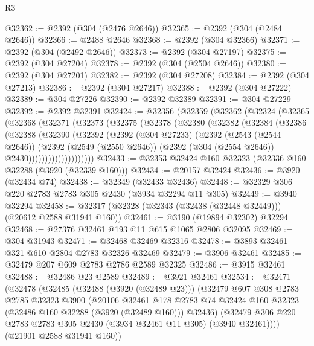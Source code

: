 \begin{lexlean}{R3}
\begin{coremodule}
@32362 := @2392 (@304 (@2476 @2646))
@32365 := @2392 (@304 (@2484 @2646))
@32366 := @2488 @2646
@32368 := @2392 (@304 @32366)
@32371 := @2392 (@304 (@2492 @2646))
@32373 := @2392 (@304 @27197)
@32375 := @2392 (@304 @27204)
@32378 := @2392 (@304 (@2504 @2646))
@32380 := @2392 (@304 @27201)
@32382 := @2392 (@304 @27208)
@32384 := @2392 (@304 @27213)
@32386 := @2392 (@304 @27217)
@32388 := @2392 (@304 @27222)
@32389 := @304 @27226
@32390 := @2392 @32389
@32391 := @304 @27229
@32392 := @2392 @32391
@32424 := @32356
    (@32359
      (@32362
        (@32324
          (@32365
            (@32368
              (@32371
                (@32373
                  (@32375
                    (@32378
                      (@32380
                        (@32382
                          (@32384
                            (@32386
                              (@32388
                                (@32390
                                  (@32392
                                    (@2392
                                      (@304 @27233)
                                      (@2392
                                        (@2543 (@2544 @2646))
                                        (@2392
                                          (@2549 (@2550 @2646))
                                          (@2392 (@304 (@2554 @2646)) @2430))))))))))))))))))))
@32433 := @32353 @32424 @160 @32323 (@32336 @160 @32288 (@3920 (@32339 @160)))
@32434 := @20157 @32424
@32436 := @3920 (@32434 @74)
@32438 := @32349 (@32433 @32436)
@32448 := @32329 @306 @220 @2783 @2783 @305 @2430 (@3934 @32294 @11 @305)
@32449 := @3940 @32294
@32458 := @32317 (@32328 (@32343 (@32438 (@32448 @32449))) (@20612 @2588 @31941 @160))
@32461 := @3190 (@19894 @32302) @32294
@32468 := @27376 @32461 @193 @11 @615 @1065 @2806 @32095
@32469 := @304 @31943
@32471 := @32468 @32469 @32316
@32478 := @3893 @32461 @321 @610 @2804 @2783 @32326 @32469
@32479 := @3906 @32461
@32485 := @32479 @207 @609 @2783 @2786 @2589 @32325
@32486 := @3915 @32461
@32488 := @32486 @23 @2589
@32489 := @3921 @32461
@32534 := @32471
    (@32478
      (@32485
        (@32488 (@3920 (@32489 @23)))
        (@32479
          @607
          @308
          @2783
          @2785
          @32323
          @3900
          (@20106
            @32461
            @178
            @2783
            @74
            @32424
            @160
            @32323
            (@32486 @160 @32288 (@3920 (@32489 @160)))
            @32436)
          (@32479 @306 @220 @2783 @2783 @305 @2430 (@3934 @32461 @11 @305) (@3940 @32461))))
      (@21901 @2588 @31941 @160))

\end{coremodule}
\end{lexlean}
